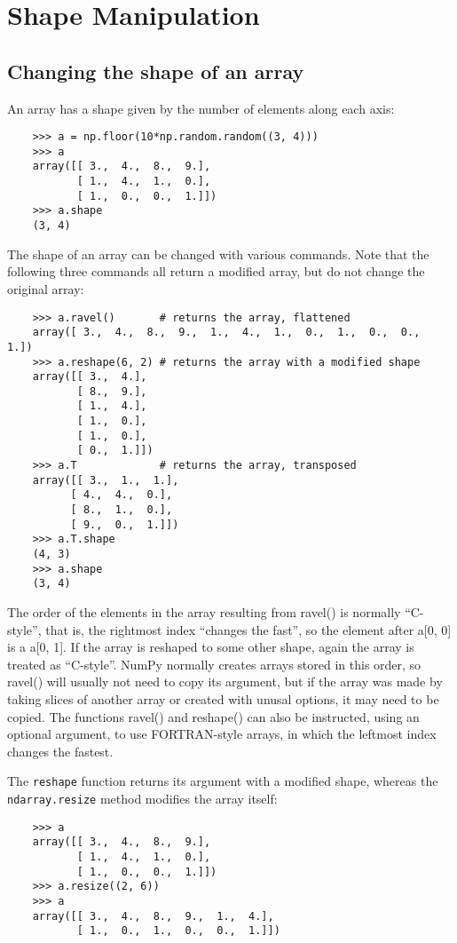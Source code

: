 \documentclass[UTF8]{article}
\begin{document}
\section{Shape Manipulation}
\subsection{Changing the shape of an array}
An array has a shape given by the number of elements along each axis:
\begin{verbatim}
    >>> a = np.floor(10*np.random.random((3, 4)))
    >>> a
    array([[ 3.,  4.,  8.,  9.],
           [ 1.,  4.,  1.,  0.],
           [ 1.,  0.,  0.,  1.]])
    >>> a.shape
    (3, 4)
\end{verbatim}

The shape of an array can  be changed with various commands. Note that the following three commands
all return a modified array, but do not change the original array:
\begin{verbatim}
    >>> a.ravel()       # returns the array, flattened
    array([ 3.,  4.,  8.,  9.,  1.,  4.,  1.,  0.,  1.,  0.,  0.,  1.])
    >>> a.reshape(6, 2) # returns the array with a modified shape
    array([[ 3.,  4.],
           [ 8.,  9.],
           [ 1.,  4.],
           [ 1.,  0.],
           [ 1.,  0.],
           [ 0.,  1.]])
    >>> a.T             # returns the array, transposed
    array([[ 3.,  1.,  1.],
          [ 4.,  4.,  0.],
          [ 8.,  1.,  0.],
          [ 9.,  0.,  1.]])
    >>> a.T.shape
    (4, 3)
    >>> a.shape
    (3, 4)
\end{verbatim}

The order of the elements in the array resulting from ravel() is normally ``C-style'', that is, the
rightmost index ``changes the fast'', so the element after a[0, 0] is a a[0, 1]. If the array is
reshaped to some other shape, again the array is treated as ``C-style''. NumPy normally creates
arrays stored in this order, so ravel() will usually not need to copy its argument, but if the
array was made by taking slices of another array or created with unusal options, it may need to be
copied. The functions ravel() and reshape() can also be instructed, using an optional argument, to
use FORTRAN-style arrays, in which the leftmost index changes the fastest.

The \texttt{reshape} function returns its argument with a modified shape, whereas the
\texttt{ndarray.resize} method modifies the array itself:
\begin{verbatim}
    >>> a
    array([[ 3.,  4.,  8.,  9.],
           [ 1.,  4.,  1.,  0.],
           [ 1.,  0.,  0.,  1.]])
    >>> a.resize((2, 6))
    >>> a
    array([[ 3.,  4.,  8.,  9.,  1.,  4.],
           [ 1.,  0.,  1.,  0.,  0.,  1.]])
\end{verbatim}
\end{document}
